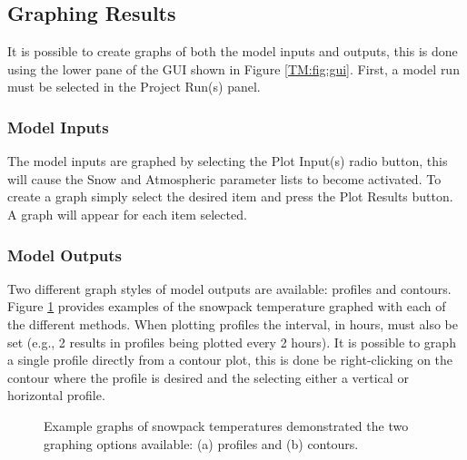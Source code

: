 \subsection{Graphing Results}
It is possible to create graphs of both the model inputs and outputs, this is done using the lower pane of the GUI shown in Figure \ref{TM:fig:gui}.  First, a model run must be selected in the Project Run(s) panel.

\subsubsection{Model Inputs}
The model inputs are graphed by selecting the Plot Input(s) radio button, this will cause the Snow and Atmospheric parameter lists to become activated. To create a graph simply select the desired item and press the Plot Results button. A graph will appear for each item selected. 

\subsubsection{Model Outputs}
Two different graph styles of model outputs are available: profiles and contours.  Figure \ref{TM:fig:example} provides examples of the snowpack temperature graphed with each of the different methods.  When plotting profiles the interval, in hours, must also be set (e.g., 2 results in profiles being plotted every 2 hours). It is possible to graph a single profile directly from a contour plot, this is done be right-clicking on the contour where the profile is desired and the selecting either a vertical or horizontal profile. 

\begin{figure}[ht!]\centering
{}\quad
{}\quad
\caption{Example graphs of snowpack temperatures demonstrated the two graphing options available: (a) profiles and (b) contours.}
\label{TM:fig:example}
\end{figure}

